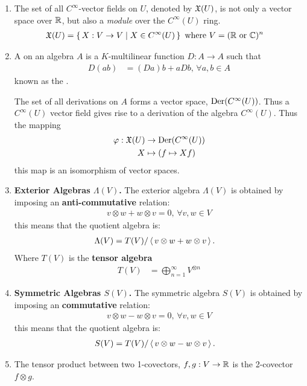 \documentclass[10pt,a4paper]{report}
\begin{document}
\begin{enumerate}
	\item The set of all $C^\infty$-vector fields on $U$, denoted by $\mathfrak{X}(U)$, is not only a vector space over $\mathbb{R}$, but also a \textit{module} over the $C^\infty(U)$ ring. \begin{align*}
		\mathfrak{X}(U) &= \left \{\,  X : V \to V \;|\; X \in C^\infty(U) \,\right \} \text{ where } V = (\mathbb{R} \text{ or } \mathbb{C})^n
	\end{align*}
	\item {} A  on an algebra $A$ is a $K$-multilinear function $D:A \to A$ such that 
	\begin{align*}
		D(ab) &= (Da)b+aDb, \, \forall a,b \in A
	\end{align*}known as the .
	
	The set of all derivations on $A$ forms a vector space, $\operatorname{Der}(C^\infty(U))$.  Thus a $C^\infty(U)$ vector field gives rise to a derivation of the algebra $C^\infty(U)$.  Thus the mapping
	\begin{align*}
		\varphi : \mathfrak{X}(U) &\to \operatorname{Der}(C^\infty(U)) \\
		X &\mapsto (f\mapsto Xf)
	\end{align*}this map is an isomorphism of vector spaces.
	\item \textbf{Exterior Algebras $\Lambda(V)$.} The exterior algebra $\Lambda(V)$ is obtained by imposing an \textbf{anti-commutative} relation: 
	\begin{align*}
		v\otimes w + w\otimes v = 0,\, \forall v,w \in V
	\end{align*}this means that the quotient algebra is:
	\begin{align*}
		\Lambda(V) &= T(V)/\left \langle\, v\otimes w + w\otimes v \,\right \rangle.
	\end{align*}Where $T(V)$ is the \textbf{tensor algebra}
	\begin{align*}
		T(V) &= \bigoplus_{n=1}^\infty V^{\otimes n}
	\end{align*}
	\item \textbf{Symmetric Algebras $S(V)$.} The symmetric algebra $S(V)$ is obtained by imposing an \textbf{commutative} relation: 
	\begin{align*}
		v\otimes w - w\otimes v = 0,\, \forall v,w \in V
	\end{align*}this means that the quotient algebra is:
	\begin{align*}
		S(V) &= T(V)/\left \langle\, v\otimes w - w\otimes v \,\right \rangle.
	\end{align*}
	\item {} The tensor product between two 1-covectors, $f,g: V \to \mathbb{R}$ is the 2-covector $f\otimes g$.

\end{enumerate}
\end{document}
